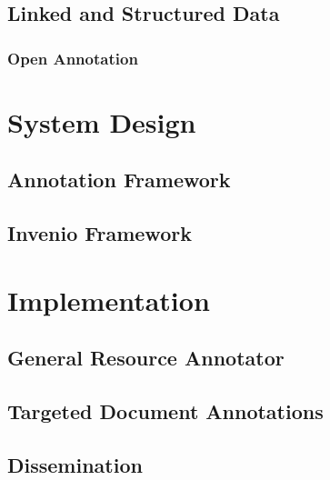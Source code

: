 \documentclass[12pt,a4paper,twoside]{report}
\begin{document}
    \subsection{Linked and Structured Data}
      \label{sec:data}
      

      \subsubsection{Open Annotation}
        \label{sec:oa}
        

  \clearpage

  \section{System Design}
    \label{sec:design}
    

    \subsection{Annotation Framework}
      \label{sec:anno}
      

    \subsection{Invenio Framework}
      \label{sec:v2}
      

  \clearpage

  \section{Implementation}
    \label{sec:impl}
    

    \subsection{General Resource Annotator}
      \label{sec:gra}
      

    \subsection{Targeted Document Annotations}
      \label{sec:notes}
      

    \subsection{Dissemination}
      \label{sec:diss}
      
\end{document}
